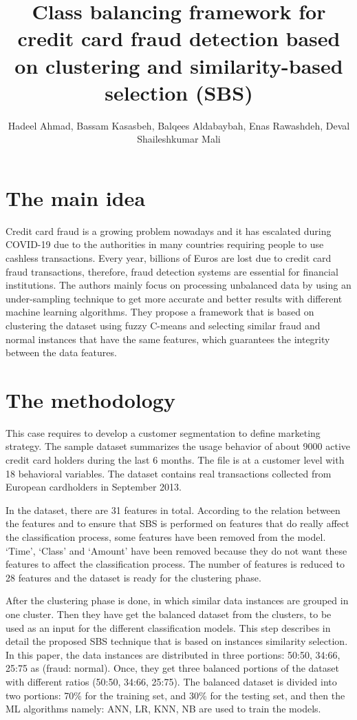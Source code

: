 \documentclass[a4paper]{article}
\title{Class balancing framework for credit card fraud detection based on clustering and similarity-based selection (SBS)}
\author[1]{Hadeel Ahmad, Bassam Kasasbeh, Balqees Aldabaybah, Enas Rawashdeh, Deval Shaileshkumar Mali}
\begin{document}
\maketitle
\section{The main idea}

Credit card fraud is a growing problem nowadays and it has escalated during COVID-19 due to the authorities in many countries requiring people to use cashless transactions. Every year, billions of Euros are lost due to credit card fraud transactions, therefore, fraud detection systems are essential for financial institutions. The authors mainly focus on processing unbalanced data by using an under-sampling technique to get more accurate and better results with different machine learning algorithms. They propose a framework that is based on clustering the dataset using fuzzy C-means and selecting similar fraud and normal instances that have the same features, which guarantees the integrity between the data features. 

\section{The methodology }

This case requires to develop a customer segmentation to define marketing strategy. The
sample dataset summarizes the usage behavior of about 9000 active credit card holders during the last 6 months. The file is at a customer level with 18 behavioral variables. The dataset contains real transactions collected from European cardholders in September 2013.

In the dataset, there are 31 features in total. According to the relation between the features and to ensure that SBS is performed on features that do really affect the classification process, some features have been removed from the model. ‘Time’, ‘Class’ and ‘Amount’ have been removed because they do not want these features to affect the classification process. The number of features is reduced to 28 features and the dataset is ready for the clustering phase.

After the clustering phase is done, in which similar data instances are grouped in one cluster. Then they have get the balanced dataset from the clusters, to be used as an input for the different classification models. This step describes in detail the proposed SBS technique that is based on instances similarity selection. In this paper, the data instances are distributed in three portions: 50:50, 34:66, 25:75 as (fraud: normal). Once, they get three balanced portions of the dataset with different ratios (50:50, 34:66, 25:75). The balanced dataset is divided into two portions: 70\% for the training set, and 30\% for the testing set, and then the ML algorithms namely: ANN, LR, KNN, NB are used to train the models.
\end{document}
